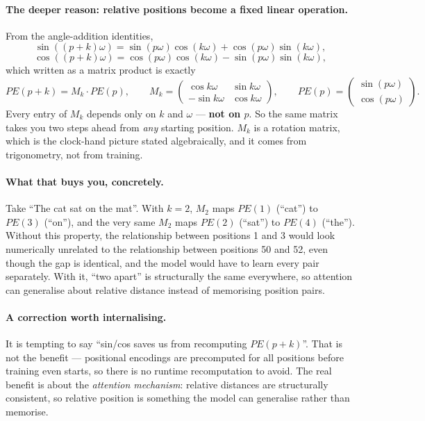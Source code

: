 \documentclass[11pt,a4paper]{article}
\begin{document}
\paragraph{The deeper reason: relative positions become a fixed linear operation.} From the
angle-addition identities,
\[
\sin((p{+}k)\omega) = \sin(p\omega)\cos(k\omega) + \cos(p\omega)\sin(k\omega),
\]
\[
\cos((p{+}k)\omega) = \cos(p\omega)\cos(k\omega) - \sin(p\omega)\sin(k\omega),
\]
which written as a matrix product is exactly
\[
PE(p + k) = M_k \cdot PE(p), \qquad
M_k = \begin{pmatrix} \cos k\omega & \sin k\omega \\ -\sin k\omega & \cos k\omega \end{pmatrix},
\qquad
PE(p) = \begin{pmatrix}\sin(p\omega)\\ \cos(p\omega)\end{pmatrix}.
\]
Every entry of $M_k$ depends only on $k$ and $\omega$ --- \textbf{not on $p$}. So the same
matrix takes you two steps ahead from \emph{any} starting position. $M_k$ is a rotation
matrix, which is the clock-hand picture stated algebraically, and it comes from trigonometry,
not from training.

\paragraph{What that buys you, concretely.} Take ``The cat sat on the mat''. With $k = 2$,
$M_2$ maps $PE(1)$ (``cat'') to $PE(3)$ (``on''), and the very same $M_2$ maps $PE(2)$
(``sat'') to $PE(4)$ (``the''). Without this property, the relationship between positions 1
and 3 would look numerically unrelated to the relationship between positions 50 and 52, even
though the gap is identical, and the model would have to learn every pair separately. With it,
``two apart'' is structurally the same everywhere, so attention can generalise about relative
distance instead of memorising position pairs.

\paragraph{A correction worth internalising.} It is tempting to say ``sin/cos saves us from
recomputing $PE(p+k)$''. That is not the benefit --- positional encodings are precomputed for
all positions before training even starts, so there is no runtime recomputation to avoid. The
real benefit is about the \emph{attention mechanism}: relative distances are structurally
consistent, so relative position is something the model can generalise rather than memorise.
\end{document}
